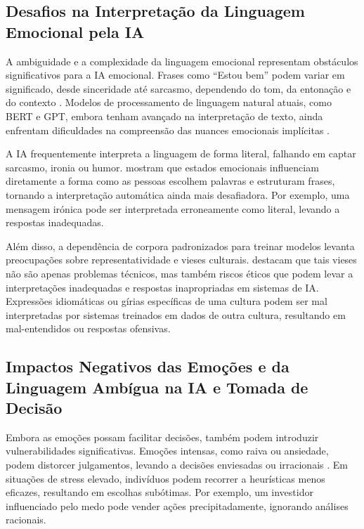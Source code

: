 \documentclass[a4paper,12pt]{report}
\begin{document}
	\subsection{Desafios na Interpretação da Linguagem Emocional pela IA}
	
	A ambiguidade e a complexidade da linguagem emocional representam obstáculos significativos para a IA emocional. Frases como “Estou bem” podem variar em significado, desde sinceridade até sarcasmo, dependendo do tom, da entonação e do contexto \parencite{pessoa2008}. Modelos de processamento de linguagem natural atuais, como BERT e GPT, embora tenham avançado na interpretação de texto, ainda enfrentam dificuldades na compreensão das nuances emocionais implícitas \parencite{russell2020}. 
	
	A IA frequentemente interpreta a linguagem de forma literal, falhando em captar sarcasmo, ironia ou humor. \textcite{beukeboom2006} mostram que estados emocionais influenciam diretamente a forma como as pessoas escolhem palavras e estruturam frases, tornando a interpretação automática ainda mais desafiadora. Por exemplo, uma mensagem irónica pode ser interpretada erroneamente como literal, levando a respostas inadequadas.
	
	Além disso, a dependência de corpora padronizados para treinar modelos levanta preocupações sobre representatividade e vieses culturais. \textcite{gigerenzer2009} destacam que tais vieses não são apenas problemas técnicos, mas também riscos éticos que podem levar a interpretações inadequadas e respostas inapropriadas em sistemas de IA. Expressões idiomáticas ou gírias específicas de uma cultura podem ser mal interpretadas por sistemas treinados em dados de outra cultura, resultando em mal-entendidos ou respostas ofensivas.
	
	\subsection{Impactos Negativos das Emoções e da Linguagem Ambígua na IA e Tomada de Decisão}
	
	Embora as emoções possam facilitar decisões, também podem introduzir vulnerabilidades significativas. Emoções intensas, como raiva ou ansiedade, podem distorcer julgamentos, levando a decisões enviesadas ou irracionais \parencite{bechara2000}. Em situações de stress elevado, indivíduos podem recorrer a heurísticas menos eficazes, resultando em escolhas subótimas. Por exemplo, um investidor influenciado pelo medo pode vender ações precipitadamente, ignorando análises racionais.
	
\end{document}
